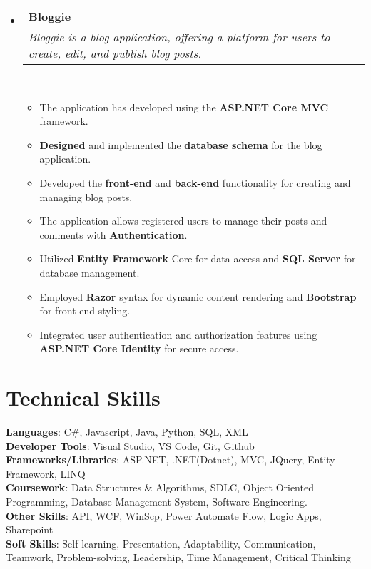 \documentclass[a4paper,12pt]{article}
\makeatletter
\newcommand{\resumeSubHeadingListStart}{\begin{itemize}[leftmargin=*,labelsep=1mm,noitemsep]}
\newcommand{\resumeSubHeadingListEnd}{\end{itemize}\vspace{2mm}}
\newcommand{\resumeItemListStart}{\begin{itemize}[leftmargin=3ex, rightmargin=2ex, noitemsep,labelsep=1.2mm,itemsep=0mm]\small}
\newcommand{\resumeItemListEnd}{\end{itemize}\vspace{-2mm}}
\newcommand{\resumeExperience}[4]{
\vspace{0.5mm}\item
    \begin{tabular*}{0.98\textwidth}[t]{l@{\extracolsep{\fill}}r}
        \textbf{#1} & \textit{\footnotesize{#3}}\\
        \textit{\footnotesize{#2}} & {}
    \end{tabular*}\\ [1mm]
    \footnotesize{#4}
}
\makeatother
\begin{document}
\resumeSubHeadingListStart
\resumeExperience {Bloggie} 
{Bloggie is a blog application, offering a platform for users to create, edit, and publish blog posts.}
{}
{}
      \resumeItemListStart
        \item {The application has developed using the \textbf{ASP.NET Core MVC} framework.}
        \item {\textbf{Designed} and implemented the \textbf{database schema} for the blog application.}
        \item {Developed the \textbf{front-end} and \textbf{back-end} functionality for creating and managing blog posts.}
        \item {The application allows registered users to manage their posts and comments with \textbf{Authentication}.}
        \item {Utilized \textbf{Entity Framework }Core for data access and \textbf{SQL Server} for database management.}
        \item {Employed \textbf{Razor} syntax for dynamic content rendering and \textbf{Bootstrap} for front-end styling.}
        \item {Integrated user authentication and authorization features using \textbf{ASP.NET Core Identity} for secure access.}\\
    \resumeItemListEnd

\resumeSubHeadingListEnd


\section{\textbf{Technical Skills}}
 \begin{itemize}[leftmargin=0.1in, label={}]
    \small{\item{
     \textbf{Languages}{: C\#, Javascript, Java, Python, SQL, XML} \\
     \textbf{Developer Tools}{: Visual Studio, VS Code, Git, Github } \\
     \textbf{Frameworks/Libraries}{: ASP.NET, .NET(Dotnet),  MVC, JQuery, Entity Framework, LINQ } \\
     \textbf{Coursework}{: Data Structures \& Algorithms, SDLC, Object Oriented Programming, Database Management System, Software Engineering.} \\
     \textbf{Other Skills}{:  API, WCF, WinScp, Power Automate Flow, Logic Apps, Sharepoint} \\
     \textbf{Soft Skills}{: Self-learning, Presentation, Adaptability, Communication, Teamwork, Problem-solving, Leadership, Time Management, Critical Thinking} \\
    }}
 \end{itemize}
\end{document}

